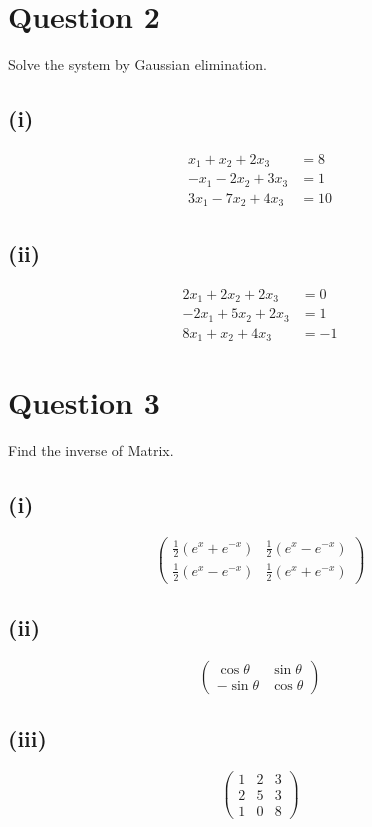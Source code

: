 \documentclass[12pt]{article}
\begin{document}
\section*{Question 2}
Solve the system by Gaussian elimination.

\subsection*{(i)}
\begin{align*}
x_1 + x_2 + 2x_3 &= 8\\
-x_1 - 2x_2 + 3x_3 &= 1\\
3x_1 - 7x_2 + 4x_3 &= 10
\end{align*}

\subsection*{(ii)}
\begin{align*}
2x_1 + 2x_2 + 2x_3 &= 0\\
-2x_1 + 5x_2 + 2x_3 &= 1\\
8x_1 + x_2 + 4x_3 &= -1
\end{align*}

\section*{Question 3}
Find the inverse of Matrix.

\subsection*{(i)}
\[
\begin{pmatrix}
\frac{1}{2}(e^x + e^{-x}) & \frac{1}{2}(e^x - e^{-x})\\
\frac{1}{2}(e^x - e^{-x}) & \frac{1}{2}(e^x + e^{-x})
\end{pmatrix}
\]

\subsection*{(ii)}
\[
\begin{pmatrix}
\cos\theta & \sin\theta\\
-\sin\theta & \cos\theta
\end{pmatrix}
\]

\subsection*{(iii)}
\[
\begin{pmatrix}
1 & 2 & 3\\
2 & 5 & 3\\
1 & 0 & 8
\end{pmatrix}
\]
\end{document}
